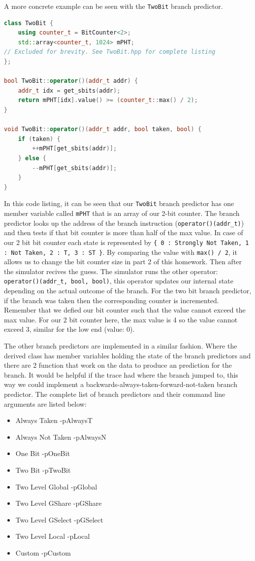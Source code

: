 \documentclass{article}
\begin{document}
        A more concrete example can be seen with the \texttt{TwoBit} branch predictor.
        \begin{lstlisting}[language=C++]
class TwoBit {
    using counter_t = BitCounter<2>;
    std::array<counter_t, 1024> mPHT;
// Excluded for brevity. See TwoBit.hpp for complete listing
};

bool TwoBit::operator()(addr_t addr) {
    addr_t idx = get_sbits(addr);
    return mPHT[idx].value() >= (counter_t::max() / 2);
}

void TwoBit::operator()(addr_t addr, bool taken, bool) {
    if (taken) {
        ++mPHT[get_sbits(addr)];
    } else {
        --mPHT[get_sbits(addr)];
    }
}
        \end{lstlisting}
        In this code listing, it can be seen that our \texttt{TwoBit} branch predictor has one member variable called \texttt{mPHT} that is an array of our 2-bit counter. The branch predictor looks up the address of the branch instruction (\texttt{operator()(addr\_t)}) and then tests if that bit counter is more than half of the max value. In case of our 2 bit bit counter each state is represented by \texttt{\{ 0 : Strongly Not Taken, 1 : Not Taken, 2 : T, 3 : ST \}}. By comparing the value with \texttt{max() / 2}, it allows us to change the bit counter size in part 2 of this homework. Then after the simulator recives the guess. The simulator runs the other operator: \texttt{operator()(addr\_t, bool, bool)}, this operator updates our internal state depending on the actual outcome of the branch. For the two bit branch predictor, if the branch was taken then the corresponding counter is incremented. Remember that we defied our bit counter such that the value cannot exceed the max value. For our 2 bit counter here, the max value is 4 so the value cannot exceed 3, similar for the low end (value: 0). \par
        The other branch predictors are implemented in a similar fashion. Where the derived class has member variables holding the state of the branch predictors and there are 2 function that work on the data to produce an prediction for the branch. It would be helpful if the trace had where the branch jumped to, this way we could implement a backwards-always-taken-forward-not-taken branch predictor. The complete list of branch predictors and their command line arguments are listed below:
        \begin{itemize}
            \item Always Taken          -pAlwaysT
            \item Always Not Taken      -pAlwaysN
            \item One Bit               -pOneBit
            \item Two Bit               -pTwoBit
            \item Two Level Global      -pGlobal
            \item Two Level GShare      -pGShare
            \item Two Level GSelect     -pGSelect
            \item Two Level Local       -pLocal
            \item Custom                -pCustom
        \end{itemize}
\end{document}
